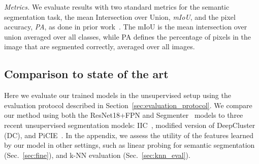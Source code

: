 \documentclass[runningheads]{llncs}
\newcommand{\supp}{appendix\xspace}
\begin{document}
\emph{Metrics.} We evaluate results with two standard metrics for the semantic segmentation task, the mean Intersection over Union, \emph{mIoU}, and the pixel accuracy, \emph{PA}, as done in prior work~\cite{cho2021picie}. The mIoU is the mean intersection over union averaged over all classes, while PA defines the percentage of pixels in the image that are segmented correctly, averaged over all images.

\vspace{-10pt}
\subsection{Comparison to state of the art}

Here we evaluate our trained models in the unsupervised setup using the evaluation protocol described in Section~\ref{sec:evaluation_protocol}. 
We compare our method using both the ResNet18+FPN and Segmenter~\cite{Strudel_2021_ICCV} models to three recent unsupervised segmentation models: IIC~\cite{ji2019invariant}, modified version of DeepCluster~\cite{caron2018deep} (DC), and PiCIE~\cite{cho2021picie}. In the 
\supp,
we assess the utility of the features learned by our model in other settings, such as linear probing for semantic segmentation (Sec.~\ref{sec:fine}), and k-NN evaluation (Sec.~\ref{sec:knn_eval}).
\end{document}
